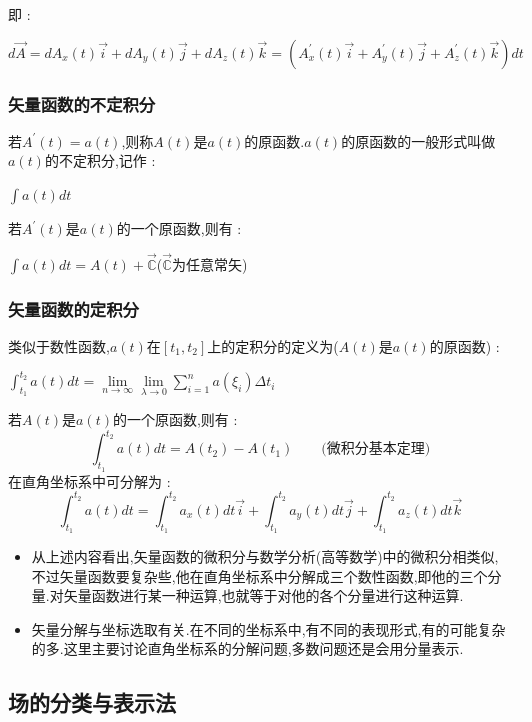 \documentclass[UTF8,12pt]{ctexbook}
\newcommand{\limNormal}[1]{\lim\limits_{#1}}
\newcommand{\derivative}{^\prime}
\newcommand{\upDownSum}[2]{\sum\limits_{#2}^{#1}}
\newcommand{\definiteIntegral}[2]{\int^{#1}_{#2}}
\newcommand{\mathConstant}{\mathbb{C}}
\begin{document}
{{{{{      即 :

      $d\vec{A} = dA_x(t)\vec{i} + dA_y(t)\vec{j} + dA_z(t)\vec{k} = (A\derivative_x(t)\vec{i} + A\derivative_y(t)\vec{j} + A\derivative_z(t)\vec{k})dt$
    }%

    \subsubsection{矢量函数的不定积分}{
      若$A\derivative(t) = a(t)$,则称$A(t)$是$a(t)$的原函数.$a(t)$的原函数的一般形式叫做$a(t)$的不定积分,记作 :

      $\int a(t)dt$

      若$A\derivative(t)$是$a(t)$的一个原函数,则有 :

      $\int a(t)dt = A(t) + \vec{\mathConstant}$\qquad ($\vec{\mathConstant}$为任意常矢)
    }

    \subsubsection{矢量函数的定积分}{
      类似于数性函数,$a(t)$在$[t_1,t_2]$上的定积分的定义为($A(t)\mbox{是}a(t)$的原函数) :

      $\definiteIntegral{t_2}{t_1}a(t)dt = \limNormal{n \to \infty}\limNormal{\lambda \to 0}\upDownSum{n}{i = 1}a(\xi_i)\Delta t_i$

      若$A(t)$是$a(t)$的一个原函数,则有 :
      $$
        \definiteIntegral{t_2}{t_1}a(t)dt = A(t_2) - A(t_1)\qquad \mbox{(微积分基本定理)}
      $$
      在直角坐标系中可分解为 :
      $$
        \definiteIntegral{t_2}{t_1}a(t)dt = \definiteIntegral{t_2}{t_1}a_x(t)dt\vec{i} + \definiteIntegral{t_2}{t_1}a_y(t)dt\vec{j} + \definiteIntegral{t_2}{t_1}a_z(t)dt\vec{k}
      $$
    }%

    \begin{itemize}
      \item 从上述内容看出,矢量函数的微积分与数学分析(高等数学)中的微积分相类似,不过矢量函数要复杂些,他在直角坐标系中分解成三个数性函数,即他的三个分量.对矢量函数进行某一种运算,也就等于对他的各个分量进行这种运算.
      \item 矢量分解与坐标选取有关.在不同的坐标系中,有不同的表现形式,有的可能复杂的多.这里主要讨论直角坐标系的分解问题,多数问题还是会用分量表示.
    \end{itemize}

  }%

  \subsection{场的分类与表示法}{

}}}}
\end{document}
